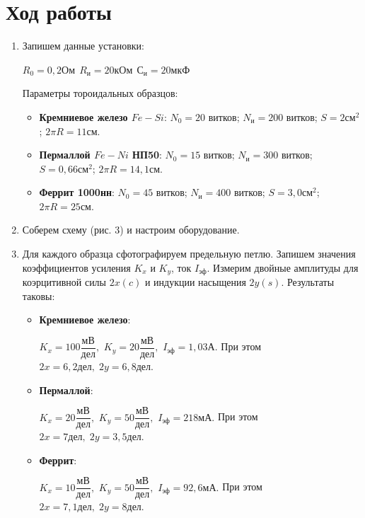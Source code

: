 \documentclass[12pt]{kiarticle}
\begin{document}
  	
  	\section{Ход работы}
  	
  	\begin{enumerate}
  	\item Запишем данные установки:
  	
  	$R_{0}=0,2 Ом \ \ R_{и}=20 кОм \ \ С_{и}=20 мкФ $
  	
  	Параметры тороидальных образцов:
  	
  \begin{itemize}
  	\item 	\textbf{Кремниевое железо $ Fe-Si $}: 
  	$N_{0}=20$ витков;
  	$N_{и}=200$ витков;
  	$S=2 см^{2}$;
  	$2\pi R = 11 см $. 
  	
  \item	\textbf{Пермаллой $ Fe-Ni $  НП50}: $N_{0}=15$ витков;
  	$N_{и}=300$ витков;
  	$S=0,66 см^{2}$;
  	$2\pi R = 14,1 см $.  
  	
  \item	\textbf{Феррит 1000нн}: $N_{0}=45$ витков;
  			$N_{и}=400$ витков;
  			$S=3,0 см^{2}$;
  			$2\pi R = 25 см $.  
  \end{itemize}
  
  	 
  	\item Соберем схему (рис. 3) и настроим оборудование. 	
 
 	\item Для каждого образца сфотографируем предельную петлю. Запишем значения коэффициентов усиления $K_{x}$ и $K_{y}$, ток $I_{эф}$. Измерим двойные амплитуды для коэрцитивной силы $2x(c)$ и индукции насыщения $2y(s)$. Результаты таковы:
 	
 	 \begin{itemize}
 	 	\item 	\textbf{Кремниевое железо}:
 	
 	$K_{x}=100 \dfrac{мВ}{дел},$
 	$K_{y}=20 \dfrac{мВ}{дел},$
 	$I_{эф}=1,03 А. $
 	При этом $ 2x = 6,2 дел, \; 2y = 6,8 дел$.
 	
 \item 	\textbf{Пермаллой}:
 	
 	$K_{x}=20 \dfrac{мВ}{дел},$
 	$K_{y}=50 \dfrac{мВ}{дел},$
 	$I_{эф}=218 мА. $
 	При этом $ 2x = 7 дел, \; 2y = 3,5 дел$.
 	
 \item 	 \textbf{Феррит}:
 	 
 $K_{x}=10 \dfrac{мВ}{дел},$
 $K_{y}=50 \dfrac{мВ}{дел},$
 $I_{эф}=92,6 мА. $
 При этом $ 2x = 7,1 дел, \; 2y = 8 дел$.
  	

\end{itemize}
\end{enumerate}
\end{document}
